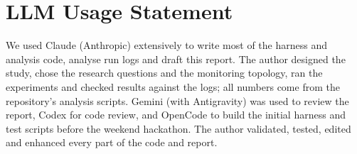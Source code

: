 \documentclass[11pt]{article}
\begin{document}
{\small

}

\clearpage
\appendix


\section*{LLM Usage Statement}
We used Claude (Anthropic) extensively to write most of the harness and analysis code, analyse run logs and draft
this report. The author designed the study, chose the research questions and the monitoring topology, ran the
experiments and checked results against the logs; all numbers come from the repository's analysis scripts. Gemini (with Antigravity) was used to review the report, Codex for code review, and OpenCode to build the initial harness and test scripts before the weekend hackathon. The author validated, tested, edited and enhanced every part of the code and report.
\end{document}
